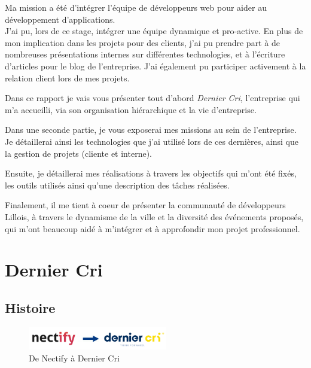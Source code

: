 \bigskip

Ma mission a été d'intégrer l'équipe de développeurs web pour aider au
développement d'applications.\\
J'ai pu, lors de ce stage, intégrer une équipe dynamique et pro-active.
En plus de mon implication dans les projets pour des clients, j'ai pu
prendre part à de nombreuses présentations internes sur différentes
technologies, et à l'écriture d'articles pour le blog de l'entreprise.
J'ai également pu participer activement à la relation client lors de mes
projets.

\bigskip

Dans ce rapport je vais vous présenter tout d'abord \emph{Dernier Cri},
l'entreprise qui m'a accueilli, via son organisation hiérarchique et la
vie d'entreprise.

\bigskip

Dans une seconde partie, je vous exposerai mes missions au sein de
l'entreprise. Je détaillerai ainsi les technologies que j'ai utilisé
lors de ces dernières, ainsi que la gestion de projets (cliente et
interne).

\bigskip

Ensuite, je détaillerai mes réalisations à travers les objectifs qui
m'ont été fixés, les outils utilisés ainsi qu'une description des tâches
réalisées.

\bigskip

Finalement, il me tient à coeur de présenter la communauté de
développeurs Lillois, à travers le dynamisme de la ville et la diversité
des événements proposés, qui m'ont beaucoup aidé à m'intégrer et à
approfondir mon projet professionnel.

\newpage

\section{Dernier Cri}\label{dernier-cri}

\bigskip

\subsection{Histoire}\label{histoire}

\begin{figure}[h]
  \centering
  \includegraphics[height=1cm]{figures/NectifyToDC.png}
  \caption{De Nectify à Dernier Cri}
\end{figure}

